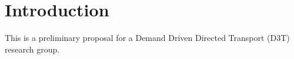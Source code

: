 \section*{Introduction}
This is a preliminary proposal for a Demand Driven Directed Transport (D3T) research group. 